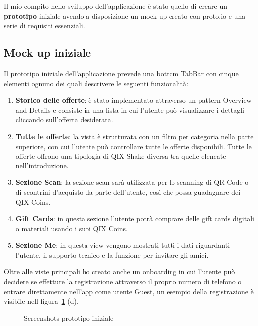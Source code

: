 
Il mio compito nello sviluppo dell'applicazione è stato quello 
di creare un \textbf{prototipo} iniziale avendo a disposizione un mock up creato con
proto.io\cite{protoio} e una serie di requisiti essenziali.

\subsection{Mock up iniziale}

Il prototipo iniziale dell'applicazione prevede una
bottom TabBar con cinque elementi ognuno dei quali
descrivere le seguenti funzionalità:

\begin{enumerate}
    \item \textbf{Storico delle offerte}: è stato implementato attraverso un pattern Overview and Details
    e consiste in una lista in cui l'utente può visualizzare i dettagli cliccando sull'offerta desiderata.
    \item \textbf{Tutte le offerte}: la vista è strutturata con un filtro per categoria nella parte superiore,
    con cui l'utente può controllare tutte le offerte disponibili. Tutte le offerte offrono una tipologia di QIX Shake diversa tra quelle elencate nell'introduzione.
    \item \textbf{Sezione Scan}: la sezione scan sarà utilizzata per lo scanning di QR Code o di scontrini d'acquisto da parte dell'utente,
    così che possa guadagnare dei QIX Coins.
    \item \textbf{Gift Cards}: in questa sezione l'utente potrà comprare delle gift cards digitali o materiali usando i suoi QIX Coins.
    \item \textbf{Sezione Me}: in questa view vengono mostrati tutti i dati riguardanti l'utente, il supporto tecnico
    e la funzione per invitare gli amici.
\end{enumerate}

Oltre alle viste principali ho creato anche un onboarding in cui l'utente può decidere se effetture la registrazione
attraverso il proprio numero di telefono o entrare direttamente nell'app come utente Guest, un esempio della registrazione è
visibile nell figura~\ref{fig:screenshots} (d).

\begin{figure}
    \hfill
    \hfill
    \hfill
    \hfill
    \hfill
    \caption{Screenshots prototipo iniziale}\label{fig:screenshots}
\end{figure}

